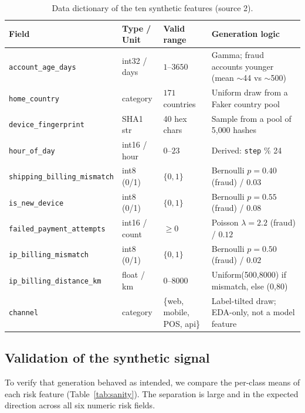 \documentclass{article}
\begin{document}
\begin{table}[H]
\centering
\caption{Data dictionary of the ten synthetic features (source 2).}
\label{tab:datadict}
\footnotesize
\begin{tabular}{lllp{5.2cm}}
\toprule
Field & Type / Unit & Valid range & Generation logic \\
\midrule
\texttt{account\_age\_days}          & int32 / days  & $1$--$3650$ & Gamma; fraud accounts younger (mean $\sim$44 vs $\sim$500) \\
\texttt{home\_country}               & category      & $171$ countries & Uniform draw from a Faker country pool \\
\texttt{device\_fingerprint}         & SHA1 str      & 40 hex chars & Sample from a pool of 5{,}000 hashes \\
\texttt{hour\_of\_day}               & int16 / hour  & $0$--$23$ & Derived: \texttt{step} \% 24 \\
\texttt{shipping\_billing\_mismatch} & int8 (0/1)    & $\{0,1\}$ & Bernoulli $p{=}0.40$ (fraud) / $0.03$ \\
\texttt{is\_new\_device}             & int8 (0/1)    & $\{0,1\}$ & Bernoulli $p{=}0.55$ (fraud) / $0.08$ \\
\texttt{failed\_payment\_attempts}   & int16 / count & $\ge 0$ & Poisson $\lambda{=}2.2$ (fraud) / $0.12$ \\
\texttt{ip\_billing\_mismatch}       & int8 (0/1)    & $\{0,1\}$ & Bernoulli $p{=}0.50$ (fraud) / $0.02$ \\
\texttt{ip\_billing\_distance\_km}   & float / km    & $0$--$8000$ & Uniform(500,8000) if mismatch, else (0,80) \\
\texttt{channel}                     & category      & \{web, mobile, POS, api\} & Label-tilted draw; EDA-only, not a model feature \\
\bottomrule
\end{tabular}
\end{table}

\subsection{Validation of the synthetic signal}
\label{subsec:sanity}
To verify that generation behaved as intended, we compare the
per-class means of each risk feature (Table~\ref{tab:sanity}). The
separation is large and in the expected direction across all six
numeric risk fields.
\end{document}
